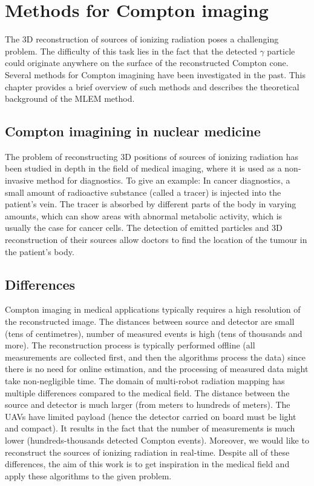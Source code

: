 \chapter{Methods for Compton imaging\label{chap:mlem_theory}}
The 3D reconstruction of sources of ionizing radiation poses a challenging problem.
The difficulty of this task lies in the fact that the detected $\gamma$ particle could originate anywhere on the surface of the reconstructed Compton cone.
Several methods for Compton imagining have been investigated in the past.
This chapter provides a brief overview of such methods and describes the theoretical background of the \ac{MLEM} method.

\section{Compton imagining in nuclear medicine}
The problem of reconstructing 3D positions of sources of ionizing radiation has been studied in depth in the field of medical imaging, where it is used as a non-invasive method for diagnostics.
To give an example:
In cancer diagnostics, a small amount of radioactive substance (called a tracer) is injected into the patient's vein.
The tracer is absorbed by different parts of the body in varying amounts, which can show areas with abnormal metabolic activity, which is usually the case for cancer cells.
The detection of emitted particles and 3D reconstruction of their sources allow doctors to find the location of the tumour in the patient's body.

\section{Differences}
Compton imaging in medical applications typically requires a high resolution of the reconstructed image.
The distances between source and detector are small (tens of centimetres), number of measured events is high (tens of thousands and more).
The reconstruction process is typically performed offline (all measurements are collected first, and then the algorithms process the data) since there is no need for online estimation, and the processing of measured data might take non-negligible time.
The domain of multi-robot radiation mapping has multiple differences compared to the medical field.
The distance between the source and detector is much larger (from meters to hundreds of meters).
The \ac{UAV}s have limited payload (hence the detector carried on board must be light and compact).
It results in the fact that the number of measurements is much lower (hundreds-thousands detected Compton events).
Moreover, we would like to reconstruct the sources of ionizing radiation in real-time.
Despite all of these differences, the aim of this work is to get inspiration in the medical field and apply these algorithms to the given problem.


